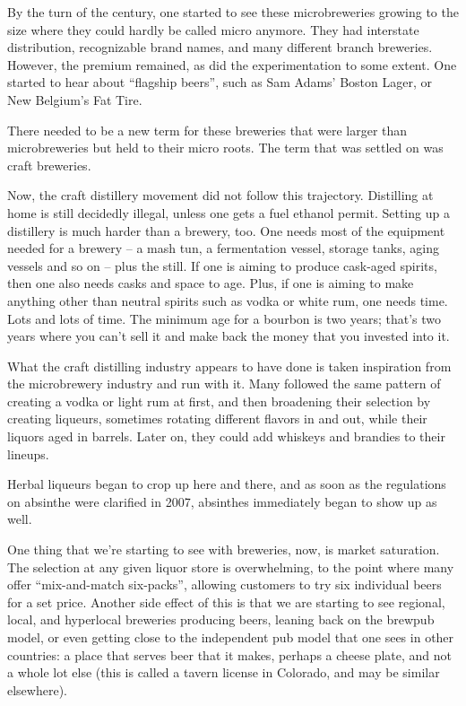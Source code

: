 \documentclass[12pt,letterpaper,oneside]{memoir}
\begin{document}
  By the turn of the century, one started to see these microbreweries growing to the size where they could hardly be called micro anymore.  They had interstate distribution, recognizable brand names, and many different branch breweries.  However, the premium remained, as did the experimentation to some extent.  One started to hear about ``flagship beers'', such as Sam Adams' Boston Lager, or New Belgium's Fat Tire.

  There needed to be a new term for these breweries that were larger than microbreweries but held to their micro roots.  The term that was settled on was craft breweries.

  Now, the craft distillery movement did not follow this trajectory.  Distilling at home is still decidedly illegal, unless one gets a fuel ethanol permit.  Setting up a distillery is much harder than a brewery, too.  One needs most of the equipment needed for a brewery -- a mash tun, a fermentation vessel, storage tanks, aging vessels and so on -- plus the still.  If one is aiming to produce cask-aged spirits, then one also needs casks and space to age.  Plus, if one is aiming to make anything other than neutral spirits such as vodka or white rum, one needs time.  Lots and lots of time.  The minimum age for a bourbon is two years; that's two years where you can't sell it and make back the money that you invested into it.

  What the craft distilling industry appears to have done is taken inspiration from the microbrewery industry and run with it.  Many followed the same pattern of creating a vodka or light rum at first, and then broadening their selection by creating liqueurs, sometimes rotating different flavors in and out, while their liquors aged in barrels.  Later on, they could add whiskeys and brandies to their lineups.

  Herbal liqueurs began to crop up here and there, and as soon as the regulations on absinthe were clarified in 2007, absinthes immediately began to show up as well.

  One thing that we're starting to see with breweries, now, is market saturation.  The selection at any given liquor store is overwhelming, to the point where many offer ``mix-and-match six-packs'', allowing customers to try six individual beers for a set price.  Another side effect of this is that we are starting to see regional, local, and hyperlocal breweries producing beers, leaning back on the brewpub model, or even getting close to the independent pub model that one sees in other countries: a place that serves beer that it makes, perhaps a cheese plate, and not a whole lot else (this is called a tavern license in Colorado, and may be similar elsewhere).
\end{document}
